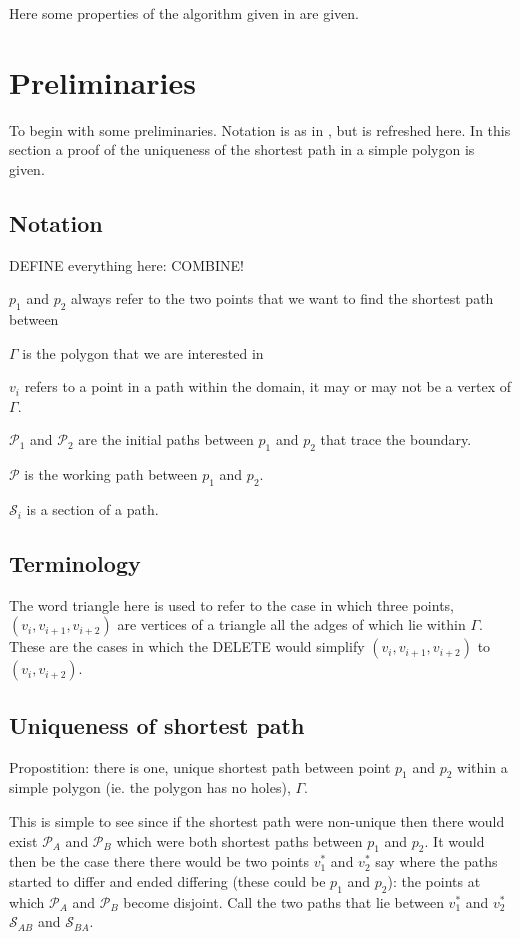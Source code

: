 \label{chap-WAD}


Here some properties of the algorithm given in  are given.

\section{Preliminaries}

To begin with some preliminaries. Notation is as in , but is refreshed here. In this section a proof of the uniqueness of the shortest path in a simple polygon is given.

\subsection{Notation}

DEFINE everything here: COMBINE!

$p_1$ and $p_2$ always refer to the two points that we want to find the shortest path between

$\Gamma$ is the polygon that we are interested in

$v_i$ refers to a point in a path within the domain, it may or may not be a vertex of $\Gamma$.

$\mathcal{P}_1$ and $\mathcal{P}_2$ are the initial paths between $p_1$ and $p_2$ that trace the boundary.

$\mathcal{P}$ is the working path between $p_1$ and $p_2$.


$\mathcal{S}_{i}$ is a section of a path.

\subsection{Terminology}

The word triangle here is used to refer to the case in which three points, $(v_i,v_{i+1},v_{i+2})$ are vertices of a triangle all the adges of which lie within $\Gamma$. These are the cases in which the DELETE would simplify $(v_i,v_{i+1},v_{i+2})$ to $(v_i,v_{i+2})$.


\subsection{Uniqueness of shortest path}
\label{app-unique-sp}
Propostition: there is one, unique shortest path between point $p_1$ and $p_2$ within a simple polygon (ie. the polygon has no holes), $\Gamma$.

This is simple to see since if the shortest path were non-unique then there would exist $\mathcal{P}_A$ and  $\mathcal{P}_B$ which were both shortest paths between $p_1$ and $p_2$. It would then be the case there there would be two points $v_1^*$ and $v_2^*$ say where the paths started to differ and ended differing (these could be $p_1$ and $p_2$): the points at which $\mathcal{P}_A$ and  $\mathcal{P}_B$ become disjoint. Call the two paths that lie between $v_1^*$ and $v_2^*$ $\mathcal{S}_{AB}$ and $\mathcal{S}_{BA}$. 

